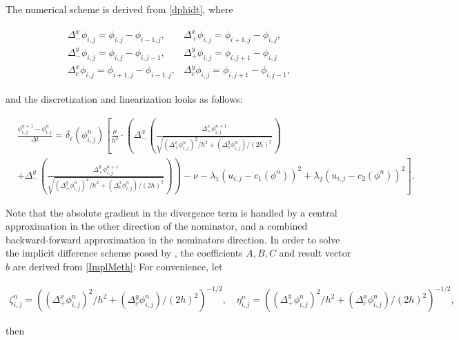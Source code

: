 The numerical scheme is derived from \eqref{dphidt}, where 

\begin{align}
\begin{array}{ll}
\Delta_{-}^x \phi_{i,j} = \phi_{i,j}-\phi_{i-1,j}, & \Delta_{+}^x \phi_{i,j} = \phi_{i+1,j}-\phi_{i,j},\\
\Delta_{-}^y \phi_{i,j} = \phi_{i,j}-\phi_{i,j-1}, & \Delta_{+}^y \phi_{i,j} = \phi_{i,j+1}-\phi_{i,j}\\
\Delta_c^x  \phi_{i,j} = \phi_{i+1,j}-\phi_{i-1,j},& \Delta_c^y \phi_{i,j} = \phi_{i,j+1}-\phi_{i,j-1},
\end{array}
\end{align}

and the discretization and linearization looks as follows:

\begin{equation}
  \begin{split}
    &\frac{\phi_{i,j}^{n+1}-\phi_{i,j}^n}{\Delta t} = \delta_\epsilon(\phi_{i,j}^n) \left[\frac{\mu}{h^2}\cdot 
\left(\Delta_-^x \left(\frac{\Delta_+^x\phi_{i,j}^{n+1}}{\sqrt{(\Delta_+^x\phi_{i,j}^n)^2/h^2 + (\Delta_c^y \phi_{i,j}^n)/(2h)^2}}\right)\right.\right.\\
    &\left.\left.+ \Delta_-^y \left(\frac{\Delta_+^y\phi_{i,j}^{n+1}}{\sqrt{(\Delta_+^y\phi_{i,j}^n)^2/h^2 + (\Delta_c ^x \phi_{i,j}^n)/(2h)^2}}\right)\right)
    - \nu - \lambda_1(u_{i,j} - c_1(\phi^n))^2 + \lambda_2(u_{i,j} - c_2(\phi^n))^2\right].
  \end{split}\label{ImplMeth}
\end{equation}

Note that the absolute gradient in the divergence term is handled by a central approximation in the other direction of the nominator, and a combined backward-forward approximation in the nominators direction.
In order to solve the implicit difference scheme posed by \cite{chan.01}, the coefficients $A,B,C$ and result vector $b$ are derived from \eqref{ImplMeth}:
For convenience, let

\begin{align*}
\zeta_{i,j}^n = \left((\Delta_+^x\phi_{i,j}^n)^2/h^2 + (\Delta_c^y \phi_{i,j}^n)/(2h)^2\right)^{-1/2},\quad
\eta_{i,j}^n = \left((\Delta_+^y\phi_{i,j}^n)^2/h^2 + (\Delta_c ^x \phi_{i,j}^n)/(2h)^2\right)^{-1/2},
\end{align*}

then

